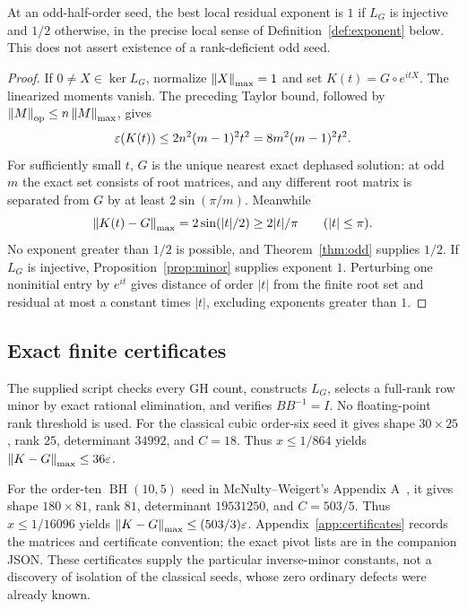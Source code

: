 \begin{proposition}\label{prop:odd-dichotomy}
At an odd-half-order seed, the best local residual exponent is $1$ if $L_G$ is injective and $1/2$ otherwise, in the precise local sense of Definition~\ref{def:exponent} below. This does not assert existence of a rank-deficient odd seed.
\end{proposition}
\begin{proof}
If $0\ne X\in\ker L_G$, normalize $\left\lVert X\right\rVert_{\mathrm{max}}=1$ and set $K(t)=G\circ e^{itX}$. The linearized moments vanish. The preceding Taylor bound, followed by $\left\lVert M\right\rVert_{\mathrm{op}}\le n\left\lVert M\right\rVert_{\mathrm{max}}$, gives
\begin{equation}\label{eq:kernelquadratic}
 \varepsilon(K(t))\le2n^2(m-1)^2t^2=8m^2(m-1)^2t^2.
\end{equation}
For sufficiently small $t$, $G$ is the unique nearest exact dephased solution: at odd $m$ the exact set consists of root matrices, and any different root matrix is separated from $G$ by at least $2\sin(\pi/m)$. Meanwhile
\[
 \left\lVert K(t)-G\right\rVert_{\mathrm{max}}=2\sin(|t|/2)\ge2|t|/\pi\qquad(|t|\le\pi).
\]
No exponent greater than $1/2$ is possible, and Theorem~\ref{thm:odd} supplies $1/2$. If $L_G$ is injective, Proposition~\ref{prop:minor} supplies exponent $1$. Perturbing one noninitial entry by $e^{it}$ gives distance of order $|t|$ from the finite root set and residual at most a constant times $|t|$, excluding exponents greater than $1$.
\end{proof}

\subsection{Exact finite certificates}
The supplied script checks every GH count, constructs $L_G$, selects a full-rank row minor by exact rational elimination, and verifies $BB^{-1}=I$. No floating-point rank threshold is used. For the classical cubic order-six seed it gives shape $30\times25$, rank $25$, determinant $34992$, and $C=18$. Thus $x\le1/864$ yields $\left\lVert K-G\right\rVert_{\mathrm{max}}\le36\varepsilon$.

For the order-ten $\operatorname{BH}(10,5)$ seed in McNulty--Weigert's Appendix A~\cite{MW}, it gives shape $180\times81$, rank $81$, determinant $19531250$, and $C=503/5$. Thus $x\le1/16096$ yields $\left\lVert K-G\right\rVert_{\mathrm{max}}\le(503/3)\varepsilon$. Appendix~\ref{app:certificates} records the matrices and certificate convention; the exact pivot lists are in the companion JSON. These certificates supply the particular inverse-minor constants, not a discovery of isolation of the classical seeds, whose zero ordinary defects were already known.
